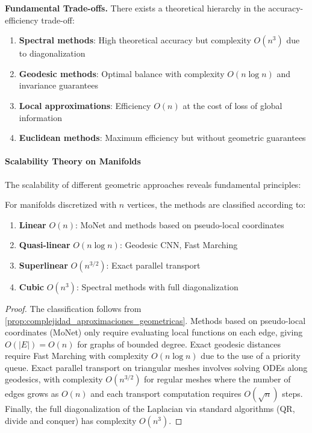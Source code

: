 \textbf{Fundamental Trade-offs.} There exists a theoretical hierarchy in the accuracy-efficiency trade-off:
\begin{enumerate}
    \item \textbf{Spectral methods}: High theoretical accuracy but complexity $O(n^3)$ due to diagonalization
    \item \textbf{Geodesic methods}: Optimal balance with complexity $O(n \log n)$ and invariance guarantees
    \item \textbf{Local approximations}: Efficiency $O(n)$ at the cost of loss of global information
    \item \textbf{Euclidean methods}: Maximum efficiency but without geometric guarantees
\end{enumerate}

\paragraph{Scalability Theory on Manifolds}

The scalability of different geometric approaches reveals fundamental principles:

\begin{proposition}\label{prop:jerarquia_complejidades}
For manifolds discretized with $n$ vertices, the methods are classified according to:
\begin{enumerate}
    \item \textbf{Linear} $O(n)$: MoNet and methods based on pseudo-local coordinates
    \item \textbf{Quasi-linear} $O(n \log n)$: Geodesic CNN, Fast Marching
    \item \textbf{Superlinear} $O(n^{3/2})$: Exact parallel transport
    \item \textbf{Cubic} $O(n^3)$: Spectral methods with full diagonalization
\end{enumerate}
\end{proposition}

\begin{proof}
The classification follows from \autoref{prop:complejidad_aproximaciones_geometricas}. Methods based on pseudo-local coordinates (MoNet) only require evaluating local functions on each edge, giving $O(|E|) = O(n)$ for graphs of bounded degree. Exact geodesic distances require Fast Marching with complexity $O(n \log n)$ due to the use of a priority queue. Exact parallel transport on triangular meshes involves solving ODEs along geodesics, with complexity $O(n^{3/2})$ for regular meshes where the number of edges grows as $O(n)$ and each transport computation requires $O(\sqrt{n})$ steps. Finally, the full diagonalization of the Laplacian via standard algorithms (QR, divide and conquer) has complexity $O(n^3)$.
\end{proof}

